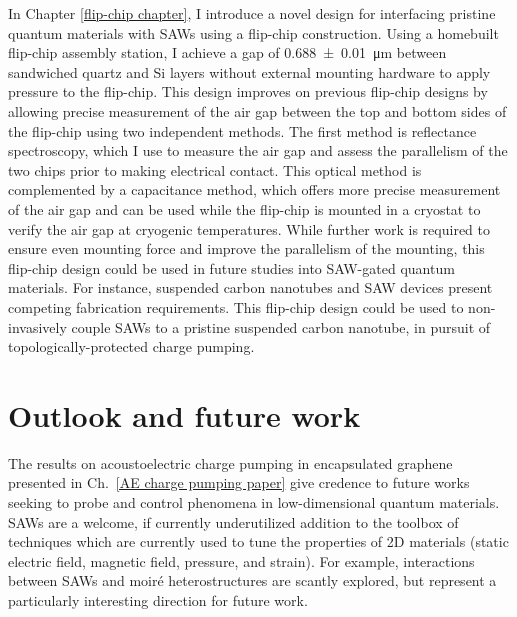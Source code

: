 \documentclass[double,12pt,1in,seploa]{beavtex}
\let\Oldsection\section
\renewcommand{\section}{\FloatBarrier\Oldsection}
\begin{document}
In Chapter \ref{flip-chip chapter}, I introduce a novel design for interfacing pristine quantum materials with SAWs using a flip-chip construction. Using a homebuilt flip-chip assembly station, I achieve a gap of \SI{0.688(10)}{\micro\meter} between sandwiched quartz and Si layers without external mounting hardware to apply pressure to the flip-chip. This design improves on previous flip-chip designs by allowing precise measurement of the air gap between the top and bottom sides of the flip-chip using two independent methods. The first method is reflectance spectroscopy, which I use to measure the air gap and assess the parallelism of the two chips prior to making electrical contact. This optical method is complemented by a capacitance method, which offers more precise measurement of the air gap and can be used while the flip-chip is mounted in a cryostat to verify the air gap at cryogenic temperatures. While further work is required to ensure even mounting force and improve the parallelism of the mounting, this flip-chip design could be used in future studies into SAW-gated quantum materials. For instance, suspended carbon nanotubes and SAW devices present competing fabrication requirements. This flip-chip design could be used to non-invasively couple SAWs to a pristine suspended carbon nanotube, in pursuit of topologically-protected charge pumping.





\section{Outlook and future work} \label{outlook and future work}
The results on acoustoelectric charge pumping in encapsulated graphene presented in Ch.\ \ref{AE charge pumping paper} give credence to future works seeking to probe and control phenomena in low-dimensional quantum materials. SAWs are a welcome, if currently underutilized addition to the toolbox of techniques which are currently used to tune the properties of 2D materials (static electric field, magnetic field, pressure, and strain). For example, interactions between SAWs and moiré heterostructures are scantly explored, but represent a particularly interesting direction for future work. 
\end{document}
